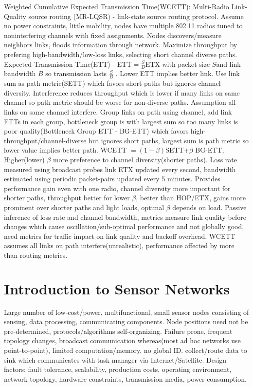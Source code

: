 \documentclass[9pt]{extarticle}
\begin{document}
\begin{multicols}{2}
Weighted Cumulative Expected Transmission Time(WCETT): Multi-Radio Link-Quality source routing (MR-LQSR) - link-state  source routing protocol. Assume no power constraints, little mobility, nodes have multiple 802.11 radios tuned to noninterfering channels with fixed assignments.  Nodes discovers/measure neighbors links, floods information through network. Maximize throughput by prefering high-bandwidth/low-loss links, selecting short channel diverse paths. Expected Transmission Time(ETT) - ETT$=\frac{S}{B}$ETX with packet size $S$and link bandwidth $B$ so transmission lasts $\frac{S}{B}$ . Lower ETT implies better link. Use link sum as path metric(SETT) which favors short paths but ignores channel diversity. Interference reduces throughput which is lower if many links on same channel so path metric should be worse for non-diverse paths. Assumption all links on same channel interfere. Group links on path using channel, add link ETTs in each group, bottleneck group is with largest sum so too many links is poor quality(Bottleneck Group ETT - BG-ETT) which favors high-throughput/channel-diverse but ignores short paths, largest sum is path metric so lower value implies better path. WCETT $=(1-\beta)$SETT$+\beta$ BG-ETT, Higher(lower) $\beta$ more preference to channel diversity(shorter paths). Loss rate measured using broadcast probes link ETX updated every second, bandwidth estimated using periodic packet-pairs updated every 5 minutes. Provides performance gain even with one radio, channel diversity more important for shorter paths, throughput better for lower $\beta$, better than HOP/ETX, gains more prominent over shorter paths and light loads, optimal $\beta$ depends on load. Passive inference of loss rate and channel bandwidth, metrics measure link quality before changes which cause oscillation/sub-optimal performance and not globally good, need metrics for traffic impact on link quality and backoff overhead, WCETT assumes all links on path interfere(unrealistic), performance affected by more than routing metrics.

\section{Introduction to Sensor Networks}

Large number of low-cost/power, multifunctional, small sensor nodes consisting of sensing, data processing, communicating components. Node positions need not be pre-determined, protocols/algorithms self-organizing. Failure prone, frequent topology changes, broadcast communication whereas(most ad hoc networks use point-to-point), limited computation/memory, no global ID. collect/route data to sink which communicates with task manager via Internet/Satellite. Design factors: fault tolerance, scalability, production costs, operating environment, network topology, hardware constraints, transmission media, power consumption.


\end{multicols}
\end{document}
